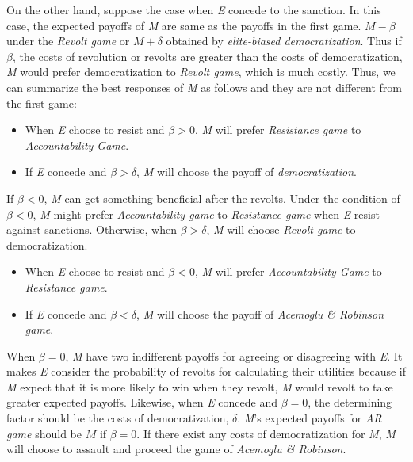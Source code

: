 \documentclass[11pt]{article}
\begin{document}
On the other hand, suppose the case when \textit{E} concede to the sanction. In this case, the expected payoffs of \textit{M} are same as the payoffs in the first game. $M-\beta$ under the \textit{Revolt game} or $M + \delta$ obtained by \textit{elite-biased democratization}. Thus if $\beta$, the costs of revolution or revolts are greater than the costs of democratization, \textit{M} would prefer democratization to \textit{Revolt game}, which is much costly. Thus, we can summarize the best responses of \textit{M} as follows and they are not different from the first game:
	
\begin{itemize}
	\item When \textit{E} choose to resist and $\beta > 0$, \textit{M} will prefer \textit{Resistance game} to \textit{Accountability Game}.
	\item If \textit{E} concede and $\beta > \delta$, \textit{M} will choose the payoff of \textit{democratization}.
\end{itemize}
	
If $\beta < 0$, \textit{M} can get something beneficial after the revolts. Under the condition of $\beta < 0$, \textit{M} might prefer \textit{Accountability game} to \textit{Resistance game} when \textit{E} resist against sanctions. Otherwise, when $\beta > \delta$, \textit{M} will choose \textit{Revolt game} to democratization. 

\begin{itemize}
	\item When \textit{E} choose to resist and $\beta < 0$, \textit{M} will prefer \textit{Accountability Game} to \textit{Resistance game}.
	\item If \textit{E} concede and $\beta < \delta$, \textit{M} will choose the payoff of \textit{Acemoglu \& Robinson game}.
\end{itemize}
	
When $\beta = 0$, \textit{M} have two indifferent payoffs for agreeing or disagreeing with \textit{E}. It makes \textit{E} consider the probability of revolts for calculating their utilities because if \textit{M} expect that it is more likely to win when they revolt, \textit{M} would revolt to take greater expected payoffs.    Likewise, when \textit{E} concede and $\beta = 0$, the determining factor should be the costs of democratization, $\delta$. \textit{M}'s expected payoffs for \textit{AR game} should be $M$ if $\beta = 0$. If there exist any costs of democratization for \textit{M}, \textit{M} will choose to assault and proceed the game of \textit{Acemoglu \& Robinson}. 
	
\end{document}
